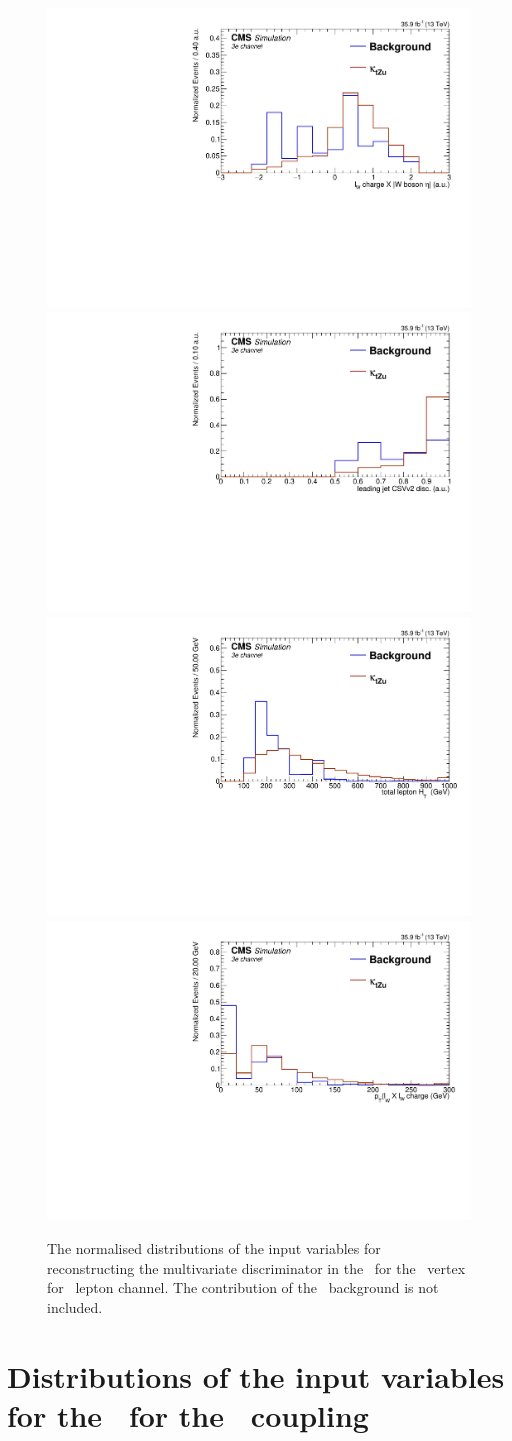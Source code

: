 \begin{figure}[htbp]
	\includegraphics[width=0.3\linewidth]{6_Search/Figures/BDTinputvars/Zut/singletop_MVA_charge_asym_eee_Normalized}
	\includegraphics[width=0.3\linewidth]{6_Search/Figures/BDTinputvars/Zut/singletop_MVA_bdiscCSVv2_jet_0_eee_Normalized}
	\includegraphics[width=0.3\linewidth]{6_Search/Figures/BDTinputvars/Zut/singletop_MVA_TotalHt_lep_eee_Normalized}
	\includegraphics[width=0.3\linewidth]{6_Search/Figures/BDTinputvars/Zut/singletop_MVA_ptWQ_eee_Normalized}
	\caption{The normalised distributions of the input variables for reconstructing the multivariate discriminator in the \STSR\ for the \Zut\ vertex for \eee\ lepton channel. The contribution of the \NPL\ background is not included. }
	\label{fig:singletopZutnormalizedeee}
\end{figure}
\newpage
\section{Distributions of the input variables for the \TTSR\ for the \Zut\ coupling}
\label{app:BDTcorrZutTop}

